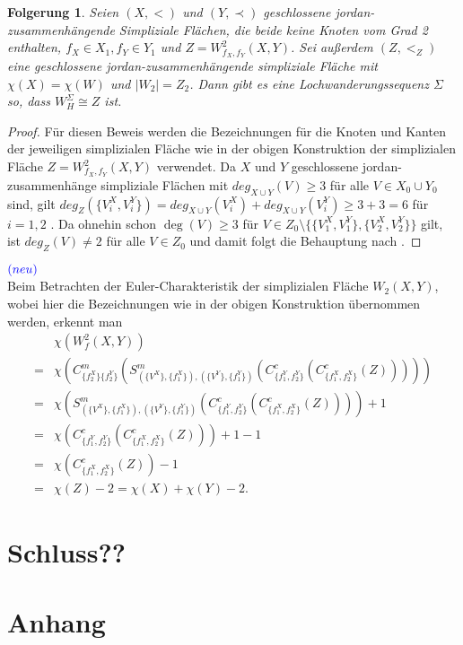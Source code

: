 \documentclass[12pt,titlepage]{article}
\newtheorem{folgerung}{Folgerung}[section]
\begin{document}
 \begin{folgerung} 
Seien $(X,<)$ und $(Y, \prec)$ geschlossene jordan-zusammenhängende Simpliziale Flächen, die beide keine Knoten vom Grad 2 enthalten, $f_X\in X_1 ,f_Y \in Y_1$ und $Z=W_{f_X,f_Y}^2(X,Y)$. Sei außerdem $(Z,<_Z)$ eine geschlossene jordan-zusammenhängende simpliziale Fläche mit $\chi(X)=\chi(W)$ und $\vert W_2 \vert=Z_2$. Dann gibt es eine Lochwanderungssequenz $\Sigma$ so, dass $W_H^{\Sigma} \cong Z$ ist. 
\end{folgerung}
\begin{proof}
 Für diesen Beweis werden die Bezeichnungen für die Knoten und Kanten der jeweiligen simplizialen Fläche wie in der obigen Konstruktion der simplizialen Fläche $Z=W^2_{f_X,f_Y}(X,Y)$ verwendet.
 Da $X$ und $Y$ geschlossene jordan-zusammenhänge simpliziale Flächen mit $deg_{X \cup Y}(V)\geq 3$ für alle $V\in X_0 \cup Y_0$ sind, gilt $deg_Z(\{V_i^X,V_i^Y\})=deg_{X \cup Y}(V_i^X)+deg_{X \cup Y}(V_i^Y)\geq 3+3 =6$ für $i=1,2$ . Da ohnehin schon $\deg(V)\geq 3$ für $V \in Z_0\setminus\{\{V_1^X,V_1^Y\},\{V_2^X,V_2^Y\}\}$ gilt, ist $deg_{Z}(V)\neq 2$ für alle $V \in Z_0$ und damit folgt die Behauptung nach .
\end{proof}
$ \textcolor{blue}{(neu)}$\\
Beim Betrachten der Euler-Charakteristik der simplizialen Fläche $W_2(X,Y)$, wobei hier die Bezeichnungen wie in der obigen Konstruktion übernommen werden, erkennt man 
\begin{align*}
&\chi(W^2_f(X,Y))\\
=&\chi(C^m_{\{f_2^X\}\{{f_2^Y}\}}(S^m_{(\{V^X\},\{f_1^X\}),(\{V^Y\},\{f_1^Y\})}(C^c_{\{f_1^Y,f_2^Y\}}(C^c_{\{f_1^X,f_2^X\}}(Z)))))\\
=&\chi(S^m_{(\{V^X\},\{f_1^X\}),(\{V^Y\},\{f_1^Y\})}(C^c_{\{f_1^Y,f_2^Y\}}(C^c_{\{f_1^X,f_2^X\}}(Z))))+1\\
=&\chi(C^c_{\{f_1^Y,f_2^Y\}}(C^c_{\{f_1^X,f_2^X\}}(Z)))+1-1\\
=&\chi(C^c_{\{f_1^X,f_2^X\}}(Z))-1\\
=&\chi(Z)-2=\chi(X)+\chi(Y)-2.
\end{align*}
\newpage
\section{Schluss??}
\newpage
\section*{Anhang}

%
\end{document}

